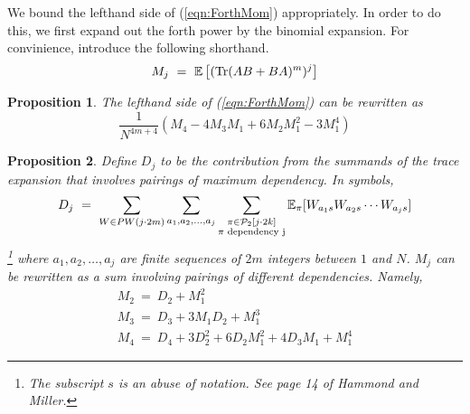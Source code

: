 \documentclass{article}
\newtheorem{prop}{Proposition}
\newcommand{\Tr}{\textnormal{Tr}}
\newcommand{\E}{\mathbb{E}}
\begin{document}
We bound the lefthand side of (\ref{eqn:ForthMom}) appropriately. In order 
to do this, we first expand out the forth power by the binomial 
expansion. For convinience, introduce the 
following shorthand. 
\[
    M_j \ = \ \E\left[(\Tr(AB + BA)^m)^j\right]
\] 

\begin{prop}
    The lefthand side of (\ref{eqn:ForthMom}) can be rewritten as 
    \begin{equation} \label{eqn:binomial}
        \frac 1 {N^{4m + 4}}
        \left(
            M_{4} -4 M_{3} M_1 + 6 M_{2} M_1^2 -3 M_1^4
        \right)
    \end{equation}
\end{prop}
\begin{prop}
    Define $D_j$ to be the contribution from the summands of the trace 
    expansion that involves pairings of maximum dependency. In symbols, 
    \begin{equation}
        D_j \ = \
        \sum_{W \in PW(j\cdot 2m)} 
        \sum_{a_1, a_2, \dots, a_j}
        \sum_{
            \substack{
            \pi \in \mathcal{P}_2[j \cdot 2k]\\
            \pi \textnormal{ dependency j}
            }
        }
\E_\pi[W_{a_1s}W_{a_2s}\cdots W_{a_js}]
    \end{equation}
    \footnote{The subscript $s$ is an abuse of notation. See page 14 of 
    Hammond and Miller.}
    where $a_1, a_2, \dots, a_j$ are finite sequences of $2m$ integers 
    between $1$ and $N$. 
    $M_j$ can be rewritten as a sum involving pairings of different 
    dependencies. Namely, 
    \begin{eqnarray} \label{eqn:MjExpansions}
        M_2 \ = \ D_2 + M_1^2 \nonumber \\
        M_3 \ = \ D_3 + 3M_1D_2 + M_1^3 \nonumber \\
        M_4 \ = \ D_4 + 3D_2^2 + 6 D_2 M_1^2 + 4D_3M_1 + M_1^4 
    \end{eqnarray}
\end{prop}
\end{document}
